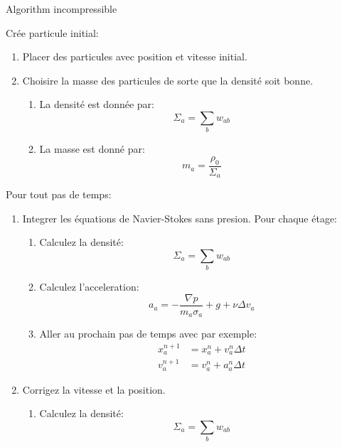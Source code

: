 \begin{frame}[shrink]{Algorithm incompressible}
\begin{block}{Crée particule initial:}
	\begin{enumerate}
		\item Placer des particules avec position et vitesse initial.
		\item Choisire la masse des particules de sorte que la densité soit bonne.
		\begin{enumerate}
			\item La densité est donnée par:
			\begin{equation*}
			\Sigma_{a}=\sum_{b}w_{ab}
			\end{equation*}
			\item La masse est donné par:
			\begin{equation*}
			m_a=\frac{\rho_{0}}{\Sigma_{a}}
			\end{equation*}
		\end{enumerate}
	\end{enumerate}
\end{block}
\begin{block}{Pour tout pas de temps:}
	\begin{enumerate}
		\item Integrer les équations de Navier-Stokes sans presion.  Pour chaque étage:
		\begin{enumerate}
			\item Calculez la densité:
			\begin{equation*}
			\Sigma_{a}=\sum_{b}w_{ab}
			\end{equation*}
			\item Calculez l'acceleration:
			\begin{equation*}
			a_a=-\frac{\nabla p}{m_{a}\sigma_{a}}+g+\nu \Delta v_{a}
			\end{equation*}
			\item Aller au prochain pas de temps avec par exemple:
			\begin{align*}
			x^{n+1}_{a}&=x^{n}_{a}+v^{n}_a\Delta t\\
			v^{n+1}_{a}&=v^{n}_{a}+a^{n}_{a}\Delta t
			\end{align*}
		\end{enumerate}
		\item Corrigez la vitesse et la position.
		\begin{enumerate}
			\item Calculez la densité:
			\begin{equation*}
			\Sigma_{a}=\sum_{b}w_{ab}

\end{equation*}
\end{enumerate}
\end{enumerate}
\end{block}
\end{frame}

